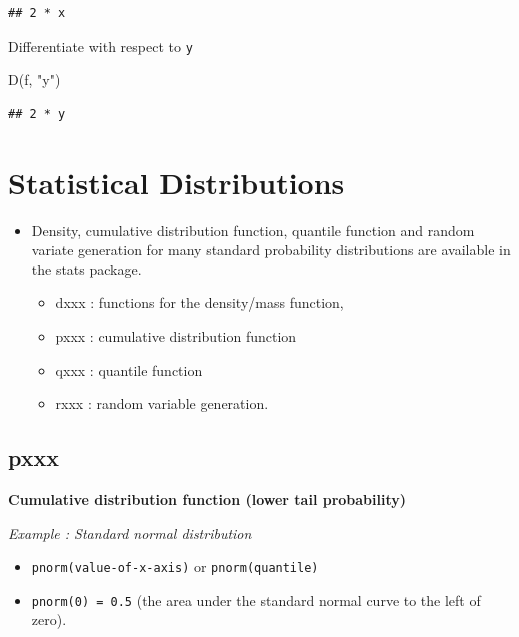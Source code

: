 \documentclass[
]{book}
\newenvironment{Shaded}{\begin{snugshade}}{\end{snugshade}}
\newcommand{\FunctionTok}[1]{\textcolor[rgb]{0.00,0.00,0.00}{#1}}
\newcommand{\NormalTok}[1]{#1}
\newcommand{\StringTok}[1]{\textcolor[rgb]{0.31,0.60,0.02}{#1}}
\providecommand{\tightlist}{%
  \setlength{\itemsep}{0pt}\setlength{\parskip}{0pt}}
\begin{document}
\begin{verbatim}
## 2 * x
\end{verbatim}

Differentiate with respect to \texttt{y}

\begin{Shaded}
\begin{Highlighting}[]
\FunctionTok{D}\NormalTok{(f, }\StringTok{"y"}\NormalTok{)}
\end{Highlighting}
\end{Shaded}

\begin{verbatim}
## 2 * y
\end{verbatim}

\hypertarget{statistical-distributions}{%
\chapter{Statistical Distributions}\label{statistical-distributions}}

\begin{itemize}
\item
  Density, cumulative distribution function, quantile function and random variate generation for many standard probability distributions are available in the stats package.

  \begin{itemize}
  \tightlist
  \item
    dxxx : functions for the density/mass function,
  \item
    pxxx : cumulative distribution function
  \item
    qxxx : quantile function
  \item
    rxxx : random variable generation.
  \end{itemize}
\end{itemize}

\hypertarget{pxxx}{%
\section{pxxx}\label{pxxx}}

\textbf{Cumulative distribution function (lower tail probability)}

\emph{Example : Standard normal distribution}

\begin{itemize}
\item
  \texttt{pnorm(value-of-x-axis)} or \texttt{pnorm(quantile)}
\item
  \texttt{pnorm(0)\ =\ 0.5} (the area under the standard normal curve to the left of zero).
\end{itemize}
\end{document}
